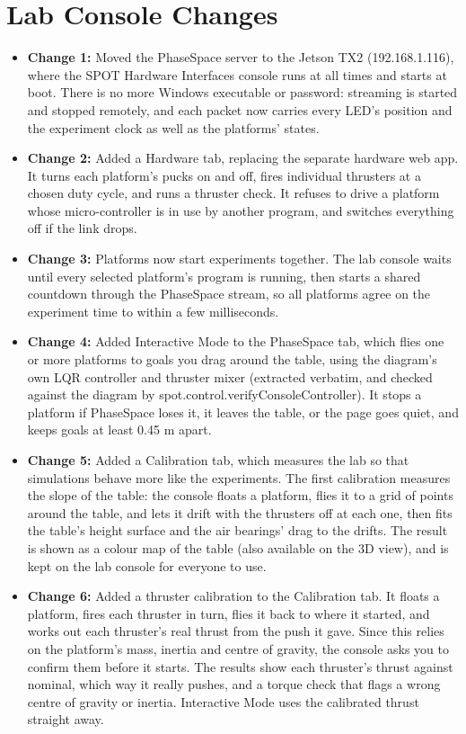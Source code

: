 \documentclass[11pt]{article}
\begin{document}
\section*{\textcolor{primaryColor}{Lab Console Changes}}
\begin{itemize}[label={\textcolor{primaryColor}{\textbullet}}]
    \item \textbf{Change 1:} Moved the PhaseSpace server to the Jetson TX2 (192.168.1.116), where the SPOT Hardware Interfaces console runs at all times and starts at boot. There is no more Windows executable or password: streaming is started and stopped remotely, and each packet now carries every LED's position and the experiment clock as well as the platforms' states.
    \item \textbf{Change 2:} Added a Hardware tab, replacing the separate hardware web app. It turns each platform's pucks on and off, fires individual thrusters at a chosen duty cycle, and runs a thruster check. It refuses to drive a platform whose micro-controller is in use by another program, and switches everything off if the link drops.
    \item \textbf{Change 3:} Platforms now start experiments together. The lab console waits until every selected platform's program is running, then starts a shared countdown through the PhaseSpace stream, so all platforms agree on the experiment time to within a few milliseconds.
    \item \textbf{Change 4:} Added Interactive Mode to the PhaseSpace tab, which flies one or more platforms to goals you drag around the table, using the diagram's own LQR controller and thruster mixer (extracted verbatim, and checked against the diagram by spot.control.\allowbreak verifyConsoleController). It stops a platform if PhaseSpace loses it, it leaves the table, or the page goes quiet, and keeps goals at least 0.45 m apart.
    \item \textbf{Change 5:} Added a Calibration tab, which measures the lab so that simulations behave more like the experiments. The first calibration measures the slope of the table: the console floats a platform, flies it to a grid of points around the table, and lets it drift with the thrusters off at each one, then fits the table's height surface and the air bearings' drag to the drifts. The result is shown as a colour map of the table (also available on the 3D view), and is kept on the lab console for everyone to use.
    \item \textbf{Change 6:} Added a thruster calibration to the Calibration tab. It floats a platform, fires each thruster in turn, flies it back to where it started, and works out each thruster's real thrust from the push it gave. Since this relies on the platform's mass, inertia and centre of gravity, the console asks you to confirm them before it starts. The results show each thruster's thrust against nominal, which way it really pushes, and a torque check that flags a wrong centre of gravity or inertia. Interactive Mode uses the calibrated thrust straight away.

\end{itemize}
\end{document}
